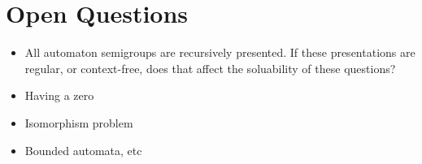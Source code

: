 \documentclass[11pt]{article}
\begin{document}
\section{Open Questions}

\begin{itemize}
\item All automaton semigroups are recursively presented. If these
  presentations are regular, or context-free, does that affect the
  soluability of these questions?
\item Having a zero
\item Isomorphism problem
\item Bounded automata, etc
\end{itemize}

\nocite{*}

\end{document}
